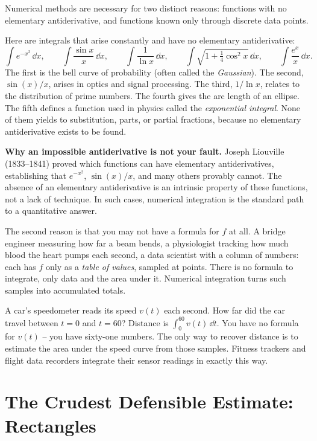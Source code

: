 Numerical methods are necessary for two distinct reasons: functions with no
elementary antiderivative, and functions known only through discrete data points.

Here are integrals that arise constantly and have no elementary antiderivative:
\[
\int e^{-x^2}\,\dd x,\qquad
\int \frac{\sin x}{x}\,\dd x,\qquad
\int \frac{1}{\ln x}\,\dd x,\qquad
\int \sqrt{1 + \tfrac14\cos^2 x}\,\dd x,\qquad
\int \frac{e^{x}}{x}\,\dd x.
\]
The first is the bell curve of probability (often called the \emph{Gaussian}). The second, $\sin(x)/x$, arises in optics
and signal processing. The third, $1/\ln x$, relates to the distribution of prime numbers.
The fourth gives the arc length of an ellipse. The fifth defines a function used in
physics called the \emph{exponential integral}. None of them yields to substitution,
parts, or partial fractions, because no elementary antiderivative exists to be found.

\begin{whybox}
\textbf{Why an impossible antiderivative is not your fault.}
Joseph Liouville (1833--1841) proved which functions can have elementary
antiderivatives, establishing that $e^{-x^2}$, $\sin(x)/x$, and many others
provably cannot. The absence of an elementary antiderivative is an intrinsic
property of these functions, not a lack of technique. In such cases, numerical
integration is the standard path to a quantitative answer.
\end{whybox}

The second reason is that you may not have a formula for $f$ at all. A bridge engineer measuring how far a beam bends, a physiologist tracking how much blood the heart pumps each second, a data scientist with a column of numbers: each has $f$ only as a \emph{table of values}, sampled at points. There is no formula to integrate, only data and the area under it. Numerical integration turns such samples into accumulated totals.

\begin{applicationbox}
A car's speedometer reads its speed $v(t)$ each second. How far did the car travel between $t = 0$ and $t = 60$? Distance is $\int_0^{60} v(t)\,\dd t$. You have no formula for $v(t)$ -- you have sixty-one numbers. The only way to recover distance is to estimate the area under the speed curve from those samples. Fitness trackers and flight data recorders integrate their sensor readings in exactly this way.
\end{applicationbox}

\section{The Crudest Defensible Estimate: Rectangles}
\label{ch27:rectangles}

